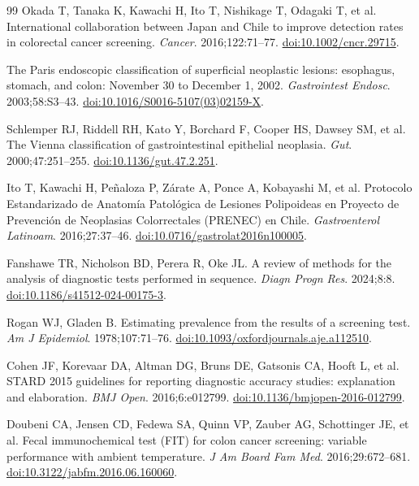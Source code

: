 \documentclass[10pt,a4paper]{article}
\begin{document}
\begin{thebibliography}{99}
Okada T, Tanaka K, Kawachi H, Ito T, Nishikage T, Odagaki T, et al.
International collaboration between Japan and Chile to improve detection
rates in colorectal cancer screening.
\textit{Cancer}. 2016;122:71--77.
\href{https://doi.org/10.1002/cncr.29715}{doi:10.1002/cncr.29715}.

The Paris endoscopic classification of superficial neoplastic lesions:
esophagus, stomach, and colon: November 30 to December 1, 2002.
\textit{Gastrointest Endosc}. 2003;58:S3--43.
\href{https://doi.org/10.1016/S0016-5107(03)02159-X}{doi:10.1016/S0016-5107(03)02159-X}.

Schlemper RJ, Riddell RH, Kato Y, Borchard F, Cooper HS, Dawsey SM, et al.
The Vienna classification of gastrointestinal epithelial neoplasia.
\textit{Gut}. 2000;47:251--255.
\href{https://doi.org/10.1136/gut.47.2.251}{doi:10.1136/gut.47.2.251}.

Ito T, Kawachi H, Pe\~naloza P, Z\'arate A, Ponce A, Kobayashi M, et al.
Protocolo Estandarizado de Anatom\'ia Patol\'ogica de Lesiones Polipoideas
en Proyecto de Prevenci\'on de Neoplasias Colorrectales (PRENEC) en Chile.
\textit{Gastroenterol Latinoam}. 2016;27:37--46.
\href{https://doi.org/10.0716/gastrolat2016n100005}{doi:10.0716/gastrolat2016n100005}.

Fanshawe TR, Nicholson BD, Perera R, Oke JL.
A review of methods for the analysis of diagnostic tests performed in
sequence.
\textit{Diagn Progn Res}. 2024;8:8.
\href{https://doi.org/10.1186/s41512-024-00175-3}{doi:10.1186/s41512-024-00175-3}.

Rogan WJ, Gladen B.
Estimating prevalence from the results of a screening test.
\textit{Am J Epidemiol}. 1978;107:71--76.
\href{https://doi.org/10.1093/oxfordjournals.aje.a112510}{doi:10.1093/oxfordjournals.aje.a112510}.

Cohen JF, Korevaar DA, Altman DG, Bruns DE, Gatsonis CA, Hooft L, et al.
STARD 2015 guidelines for reporting diagnostic accuracy studies: explanation and elaboration.
\textit{BMJ Open}. 2016;6:e012799.
\href{https://doi.org/10.1136/bmjopen-2016-012799}{doi:10.1136/bmjopen-2016-012799}.

Doubeni CA, Jensen CD, Fedewa SA, Quinn VP, Zauber AG, Schottinger JE, et al.
Fecal immunochemical test (FIT) for colon cancer screening: variable performance with ambient temperature.
\textit{J Am Board Fam Med}. 2016;29:672--681.
\href{https://doi.org/10.3122/jabfm.2016.06.160060}{doi:10.3122/jabfm.2016.06.160060}.


\end{thebibliography}
\end{document}
